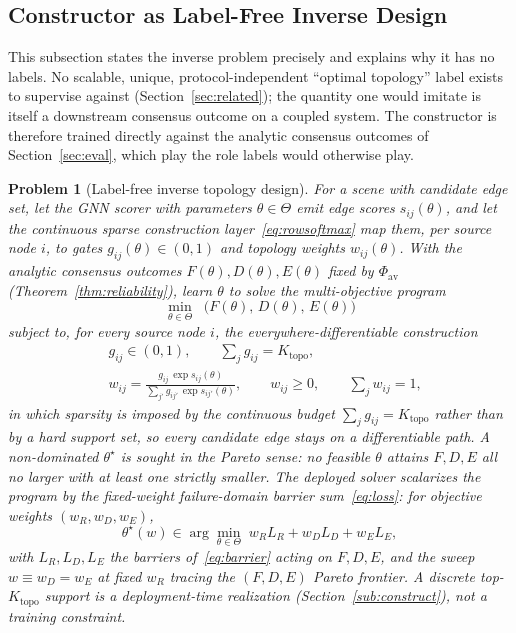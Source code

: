 \documentclass[journal]{IEEEtran}
\newtheorem{problem}{Problem}
\newcommand{\Ktopo}{\ensuremath{K_{\mathrm{topo}}}}      %
\begin{document}
\subsection{Constructor as Label-Free Inverse Design}\label{sub:problem}

This subsection states the inverse problem precisely and explains why it has no
labels. No scalable, unique, protocol-independent ``optimal topology'' label
exists to supervise against (Section~\ref{sec:related}); the quantity one would
imitate is itself a downstream consensus outcome on a coupled system. The
constructor is therefore trained directly against the analytic consensus outcomes
of Section~\ref{sec:eval}, which play the role labels would otherwise play.

\begin{problem}[Label-free inverse topology design]\label{prob:construct}
For a scene with candidate edge set, let the GNN scorer with parameters
$\theta\in\Theta$ emit edge scores $s_{ij}(\theta)$, and let the continuous
sparse construction layer~\eqref{eq:rowsoftmax} map them, per source node $i$, to
gates $g_{ij}(\theta)\in(0,1)$ and topology weights $w_{ij}(\theta)$. With the
analytic consensus outcomes $F(\theta),D(\theta),E(\theta)$ fixed by
$\Phi_{\mathrm{av}}$ (Theorem~\ref{thm:reliability}), learn $\theta$ to solve the
multi-objective program
\begin{equation}
  \min_{\theta\in\Theta}\;\; \big(F(\theta),\,D(\theta),\,E(\theta)\big)
  \label{eq:problem}
\end{equation}
subject to, for every source node $i$, the everywhere-differentiable construction
\[
  \begin{aligned}
  &g_{ij}\in(0,1),\qquad \textstyle\sum_{j} g_{ij}=\Ktopo,\\
  &w_{ij}=\frac{g_{ij}\,\exp s_{ij}(\theta)}{\sum_{j'} g_{ij'}\,\exp s_{ij'}(\theta)},
    \qquad w_{ij}\ge 0,\qquad \textstyle\sum_{j} w_{ij}=1,
  \end{aligned}
\]
in which sparsity is imposed by the continuous budget $\sum_j g_{ij}=\Ktopo$
rather than by a hard support set, so every candidate edge stays on a
differentiable path. A non-dominated $\theta^\star$ is sought in the Pareto
sense: no feasible $\theta$ attains $F,D,E$ all no larger with at least one
strictly smaller. The deployed solver scalarizes the program by the fixed-weight
failure-domain barrier sum~\eqref{eq:loss}: for objective weights
$(w_R,w_D,w_E)$,
\[
  \theta^\star(w)\in\arg\min_{\theta\in\Theta}\; w_R L_R + w_D L_D + w_E L_E,
\]
with $L_R,L_D,L_E$ the barriers of~\eqref{eq:barrier} acting on $F,D,E$, and the
sweep $w\equiv w_D=w_E$ at fixed $w_R$ tracing the $(F,D,E)$ Pareto frontier. A
discrete top-$\Ktopo$ support is a deployment-time realization
(Section~\ref{sub:construct}), not a training constraint.
\end{problem}
\end{document}
